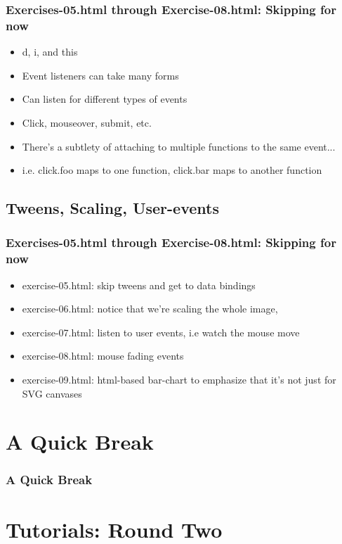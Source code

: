 \documentclass{beamer}
\begin{document}
\begin{frame}
    \frametitle{Exercises-05.html through Exercise-08.html: Skipping for now}
    \begin{itemize}
    \item d, i, and this
    \item Event listeners can take many forms
    \item Can listen for different types of events
    \item Click, mouseover, submit, etc.
    \item There's a subtlety of attaching to multiple functions to the same event...
    \item i.e. click.foo maps to one function, click.bar maps to another function
    \end{itemize}
\end{frame}



\subsection{Tweens, Scaling, User-events}

\begin{frame}
    \frametitle{Exercises-05.html through Exercise-08.html: Skipping for now}
    \begin{itemize}
    \item exercise-05.html: skip tweens and get to data bindings
    \item exercise-06.html: notice that we're scaling the whole image,
    \item exercise-07.html: listen to user events, i.e watch the mouse move
    \item exercise-08.html: mouse fading events
    \item exercise-09.html: html-based bar-chart to emphasize that it's not just for SVG canvases
    \end{itemize}
\end{frame}


\section{A Quick Break}

\begin{frame}
    \frametitle{A Quick Break}
\end{frame}


\section{Tutorials: Round Two}
\end{document}
